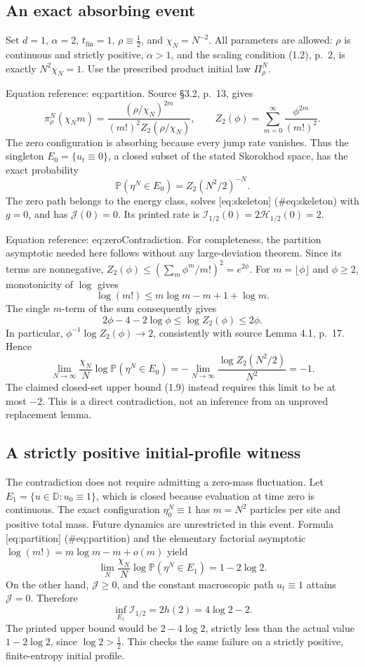 \documentclass[10pt]{article}
\begin{document}
\subsection*{An exact absorbing event}
Set \(d=1\), \(\alpha=2\), \(t_{\mathrm{fin}}=1\), \(\rho\equiv\tfrac12\), and \(\chi_N=N^{-2}\). All parameters are allowed: \(\rho\) is continuous and strictly positive, \(\alpha>1\), and the scaling condition (1.2), p. 2, is exactly \(N^2\chi_N=1\). Use the prescribed product initial law \(\Pi_\rho^N\).\par
Equation reference: eq:partition. Source §3.2, p. 13, gives \[
\pi_\rho^N(\chi_Nm)=
 \frac{(\rho/\chi_N)^{2m}}{(m!)^2 Z_2(\rho/\chi_N)},
\qquad
Z_2(\phi)=\sum_{m=0}^{\infty}\frac{\phi^{2m}}{(m!)^2}.\] The zero configuration is absorbing because every jump rate vanishes. Thus the singleton \(E_0=\{u_t\equiv0\}\), a closed subset of the stated Skorokhod space, has the exact probability \[\mathbb P(\eta^N\in E_0)=Z_2(N^2/2)^{-N}.\] The zero path belongs to the energy class, solves [eq:skeleton] (\#eq:skeleton) with \(g=0\), and has \(\mathcal J(0)=0\). Its printed rate is \(\mathcal I_{1/2}(0)=2\mathcal H_{1/2}(0)=2\).\par
Equation reference: eq:zeroContradiction. For completeness, the partition asymptotic needed here follows without any large-deviation theorem. Since its terms are nonnegative, \(Z_2(\phi)\le(\sum_m\phi^m/m!)^2=e^{2\phi}\). For \(m=\lfloor\phi\rfloor\) and \(\phi\ge2\), monotonicity of \(\log\) gives \[\log(m!)\le m\log m-m+1+\log m.\] The single \(m\)-term of the sum consequently gives \[2\phi-4-2\log\phi\le\log Z_2(\phi)\le2\phi.\] In particular, \(\phi^{-1}\log Z_2(\phi)\to2\), consistently with source Lemma 4.1, p. 17. Hence \[
\lim_{N\to\infty}\frac{\chi_N}{N}\log\mathbb P(\eta^N\in E_0)
=-\lim_{N\to\infty}\frac{\log Z_2(N^2/2)}{N^2}
=-1.\] The claimed closed-set upper bound (1.9) instead requires this limit to be at most \(-2\). This is a direct contradiction, not an inference from an unproved replacement lemma.\par
\subsection*{A strictly positive initial-profile witness}
The contradiction does not require admitting a zero-mass fluctuation. Let \(E_1=\{u\in\mathbb D:u_0\equiv1\}\), which is closed because evaluation at time zero is continuous. The exact configuration \(\eta_0^N\equiv1\) has \(m=N^2\) particles per site and positive total mass. Future dynamics are unrestricted in this event. Formula [eq:partition] (\#eq:partition) and the elementary factorial asymptotic \(\log(m!)=m\log m-m+o(m)\) yield \[\lim_N\frac{\chi_N}{N}\log\mathbb P(\eta^N\in E_1)=1-2\log2.\] On the other hand, \(\mathcal J\ge0\), and the constant macroscopic path \(u_t\equiv1\) attains \(\mathcal J=0\). Therefore \[\inf_{E_1}\mathcal I_{1/2}=2h(2)=4\log2-2.\] The printed upper bound would be \(2-4\log2\), strictly less than the actual value \(1-2\log2\), since \(\log2>\tfrac12\). This checks the same failure on a strictly positive, finite-entropy initial profile.\par
\end{document}
